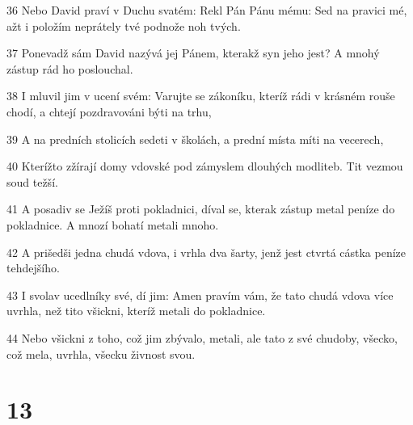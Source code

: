 \par 36 Nebo David praví v Duchu svatém: Rekl Pán Pánu mému: Sed na pravici mé, ažt i položím neprátely tvé podnože noh tvých.
\par 37 Ponevadž sám David nazývá jej Pánem, kterakž syn jeho jest? A mnohý zástup rád ho poslouchal.
\par 38 I mluvil jim v ucení svém: Varujte se zákoníku, kteríž rádi v krásném rouše chodí, a chtejí pozdravováni býti na trhu,
\par 39 A na predních stolicích sedeti v školách, a prední místa míti na vecerech,
\par 40 Kterížto zžírají domy vdovské pod zámyslem dlouhých modliteb. Tit vezmou soud težší.
\par 41 A posadiv se Ježíš proti pokladnici, díval se, kterak zástup metal peníze do pokladnice. A mnozí bohatí metali mnoho.
\par 42 A prišedši jedna chudá vdova, i vrhla dva šarty, jenž jest ctvrtá cástka peníze tehdejšího.
\par 43 I svolav ucedlníky své, dí jim: Amen pravím vám, že tato chudá vdova více uvrhla, než tito všickni, kteríž metali do pokladnice.
\par 44 Nebo všickni z toho, což jim zbývalo, metali, ale tato z své chudoby, všecko, což mela, uvrhla, všecku živnost svou.

\chapter{13}

